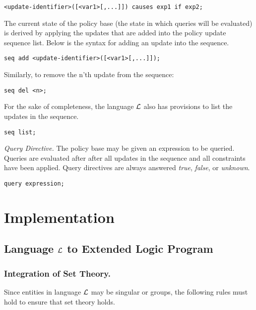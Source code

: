 \documentclass{llncs}
\begin{document}
    \begin{verbatim}<update-identifier>([<var1>[,...]]) causes exp1 if exp2;\end{verbatim}

    The current state of the policy base (the state in which queries will be
    evaluated) is derived by applying the updates that are added into
    the policy update sequence list. Below is the syntax for adding an
    update into the sequence.

    \begin{verbatim}seq add <update-identifier>([<var1>[,...]]);\end{verbatim}

    Similarly, to remove the n'th update from the sequence:

    \begin{verbatim}seq del <n>;\end{verbatim}

    For the sake of completeness, the language $\cal{L}$ also has provisions to
    list the updates in the sequence.

    \begin{verbatim}seq list;\end{verbatim}

    \emph{Query Directive.} The policy base may be given an expression to be
    queried. Queries are evaluated after after all updates in the
    sequence and all constraints have been applied. Query directives are
    always answered \emph{true}, \emph{false}, or \emph{unknown}.

    \begin{verbatim}query expression;\end{verbatim}

  \section{Implementation}

    \subsection{Language $\cal{L}$ to Extended Logic Program}

      \subsubsection{Integration of Set Theory.}

        Since entities in language $\cal{L}$ may be singular or groups,
        the following rules must hold to ensure that set theory holds.
\end{document}
